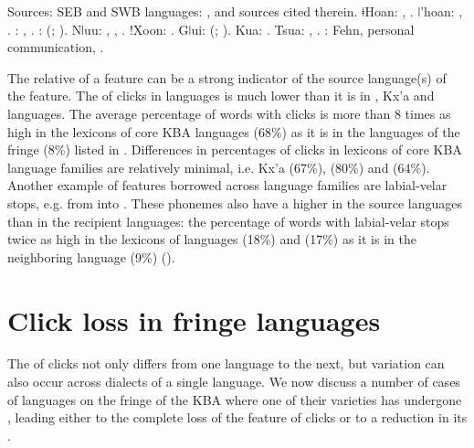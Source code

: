 \documentclass[output=paper
,newtxmath
,modfonts
,nonflat]{langsci/langscibook}
\begin{document}
Sources: SEB and SWB languages: \citet{Pakendorf2017}, and sources cited therein. ǂHoan: \citet{Collins2014}, \citet{Gruber1975}. ǀ’hoan: \citet{Dickens1994}, \citet{Miller-Ockhuizen2003}. : \citet[47]{Brugman2009}, \citet{Haacke2002}. : \citeauthor{Visser2001} (\citeyear{Visser2001}; \citeyear{Visser2013}). Nǀuu: \citet{Miller2014}, \citet{Miller2009}, \citet{Miller2007}. !Xoon: \citet{Traill1985,Traill1994}. Gǀui: \citeauthor{Nakagawa1996} (\citeyear{Nakagawa1996}; \citeyear{Nakagawa2013}). Kua: \citet{Chebanne2014}. Tsua: \citet{Mathes2016}, \citet{Chebanne2013}. : Fehn, personal communication, \citet{Vossen2013}. 

The relative  of a feature can be a strong indicator of the source language(s) of the feature. The  of clicks in  languages is much lower than it is in , Kx'a and  languages. The average percentage of words with clicks is more than 8 times as high in the lexicons of core KBA languages (68\%) as it is in the languages of the fringe (8\%) listed in . Differences in percentages of clicks in lexicons of core KBA language families are relatively minimal, i.e. Kx'a (67\%),  (80\%) and  (64\%). Another example of features borrowed across language families are labial-velar stops, e.g. from  into . These phonemes also have a higher  in the source languages than in the recipient languages: the percentage of words with labial-velar stops twice as high in the lexicons of  languages  (18\%) and  (17\%) as it is in the neighboring  language  (9\%) (\citealt{BostoenDonzo2013}). 

\section{Click loss in fringe languages}\label{sec:sands:3}

The  of clicks not only differs from one language to the next, but variation can also occur across dialects of a single language. We now discuss a number of cases of  languages on the fringe of the KBA where one of their varieties has undergone , leading either to the complete loss of the feature of clicks or to a reduction in its . 
\end{document}
